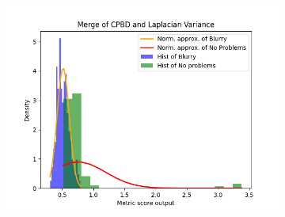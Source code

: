 \begin{figure}[H]
\begin{subfigure}[t]{0.48\textwidth}
        \caption{}
        \label{fig:CPBD_LV_thresh}
    \end{subfigure}\hspace{1em}
    \begin{subfigure}[t]{0.48\textwidth}
        \includegraphics[width=\textwidth]{Figures/results_on_thresholds/output_dens_cpbd_lv.png}
        \caption{}
        \label{fig:CPBD_LV_dens}
    \end{subfigure}\hspace{1em}
    \caption{}
    \label{fig:CPBD_LV_final}
\end{figure}

